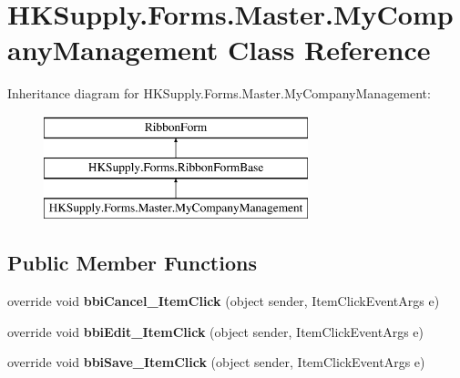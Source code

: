 \hypertarget{class_h_k_supply_1_1_forms_1_1_master_1_1_my_company_management}{}\section{H\+K\+Supply.\+Forms.\+Master.\+My\+Company\+Management Class Reference}
\label{class_h_k_supply_1_1_forms_1_1_master_1_1_my_company_management}
Inheritance diagram for H\+K\+Supply.\+Forms.\+Master.\+My\+Company\+Management\+:\begin{figure}[H]
\begin{center}
\leavevmode
\includegraphics[height=3.000000cm]{class_h_k_supply_1_1_forms_1_1_master_1_1_my_company_management}
\end{center}
\end{figure}
\subsection*{Public Member Functions}
\begin{DoxyCompactItemize}
\item 
\mbox{\label{class_h_k_supply_1_1_forms_1_1_master_1_1_my_company_management_a05f42f6e060e08dae31ccc1a9c864f02}} 
override void {\bfseries bbi\+Cancel\+\_\+\+Item\+Click} (object sender, Item\+Click\+Event\+Args e)
\item 
\mbox{\label{class_h_k_supply_1_1_forms_1_1_master_1_1_my_company_management_a2f30331fde9444efdd733d592cbd5a20}} 
override void {\bfseries bbi\+Edit\+\_\+\+Item\+Click} (object sender, Item\+Click\+Event\+Args e)
\item 
\mbox{\label{class_h_k_supply_1_1_forms_1_1_master_1_1_my_company_management_ad8ea4ef203c7a13ab3c3714a4f4f256f}} 
override void {\bfseries bbi\+Save\+\_\+\+Item\+Click} (object sender, Item\+Click\+Event\+Args e)
\end{DoxyCompactItemize}
